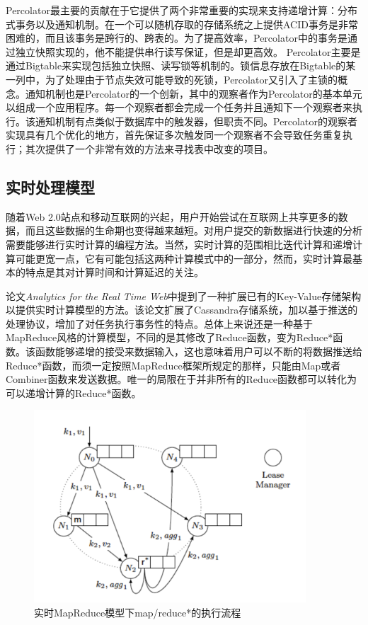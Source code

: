 Percolator最主要的贡献在于它提供了两个非常重要的实现来支持递增计算：分布式事务以及通知机制。在一个可以随机存取的存储系统之上提供ACID事务是非常困难的，而且该事务是跨行的、跨表的。为了提高效率，Percolator中的事务是通过独立快照实现的，他不能提供串行读写保证，但是却更高效。 Percolator主要是通过Bigtable来实现包括独立快照、读写锁等机制的。锁信息存放在Bigtable的某一列中，为了处理由于节点失效可能导致的死锁，Percolator又引入了主锁的概念。通知机制也是Percolator的一个创新，其中的观察者作为Percolator的基本单元以组成一个应用程序。每一个观察者都会完成一个任务并且通知下一个观察者来执行。该通知机制有点类似于数据库中的触发器，但职责不同。Percolator的观察者实现具有几个优化的地方，首先保证多次触发同一个观察者不会导致任务重复执行；其次提供了一个非常有效的方法来寻找表中改变的项目。


\subsection{实时处理模型}
随着Web 2.0站点和移动互联网的兴起，用户开始尝试在互联网上共享更多的数据，而且这些数据的生命期也变得越来越短。对用户提交的新数据进行快速的分析需要能够进行实时计算的编程方法。当然，实时计算的范围相比迭代计算和递增计算可能更宽一点，它有可能包括这两种计算模式中的一部分，然而，实时计算最基本的特点是其对计算时间和计算延迟的关注。

论文\textit{Analytics for the Real Time Web}\cite{grinev2011analytics}中提到了一种扩展已有的Key-Value存储架构以提供实时计算模型的方法。该论文扩展了Cassandra存储系统，加以基于推送的处理协议，增加了对任务执行事务性的特点。总体上来说还是一种基于MapReduce风格的计算模型，不同的是其修改了Reduce函数，变为Reduce*函数。该函数能够递增的接受来数据输入，这也意味着用户可以不断的将数据推送给Reduce*函数，而须一定按照MapReduce框架所规定的那样，只能由Map或者Combiner函数来发送数据。唯一的局限在于并非所有的Reduce函数都可以转化为可以递增计算的Reduce*函数。

\begin{figure}[h!]
\centering
\includegraphics[width=4in]{../figures/realtimep.pdf}
\caption{实时MapReduce模型下map/reduce*的执行流程}
\label{fig:realtimep}
\end{figure}

